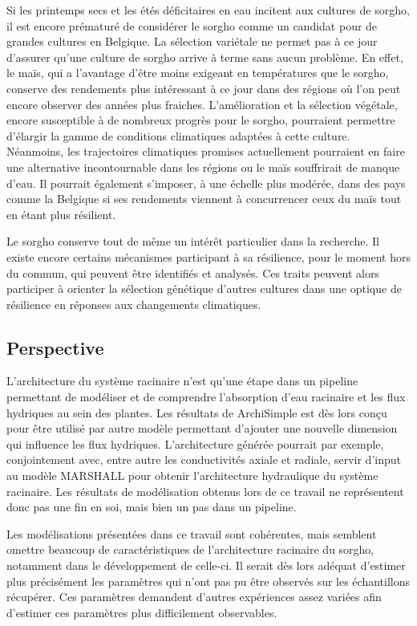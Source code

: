 Si les printemps secs et les étés déficitaires en eau incitent aux cultures de sorgho, il est encore prématuré de considérer le sorgho comme un candidat pour de grandes cultures en Belgique.
La sélection variétale ne permet pas à ce jour d'assurer qu'une culture de sorgho arrive à terme sans aucun problème.
En effet, le maïs, qui a l'avantage d'être moins exigeant en températures que le sorgho, conserve des rendements plus intéressant à ce jour dans des régions où l'on peut encore observer des années plus fraiches.
L'amélioration et la sélection végétale, encore susceptible à de nombreux progrès pour le sorgho, pourraient permettre d'élargir la gamme de conditions climatiques adaptées à cette culture.
Néanmoins, les trajectoires climatiques promises actuellement pourraient en faire une alternative incontournable dans les régions ou le maïs souffrirait de manque d'eau.
Il pourrait également s'imposer, à une échelle plus modérée, dans des pays comme la Belgique si ses rendements viennent à concurrencer ceux du maïs tout en étant plus résilient.
\newline

Le sorgho conserve tout de même un intérêt particulier dans la recherche.
Il existe encore certains mécanismes participant à sa résilience, pour le moment hors du commun, qui peuvent être identifiés et analysés.
Ces traits peuvent alors participer à orienter la sélection génétique d'autres cultures dans une optique de résilience en réponses aux changements climatiques.

\subsection{Perspective}

L'architecture du système racinaire n'est qu'une étape dans un pipeline permettant de modéliser et de comprendre l'absorption d'eau racinaire et les flux hydriques au sein des plantes.
Les résultats de ArchiSimple est dès lors conçu pour être utilisé par autre modèle permettant d'ajouter une nouvelle dimension qui influence les flux hydriques.
L'architecture générée pourrait par exemple, conjointement avec, entre autre les conductivités axiale et radiale, servir d'input au modèle MARSHALL pour obtenir l'architecture hydraulique du système racinaire.
Les résultats de modélisation obtenus lors de ce travail ne représentent donc pas une fin en soi, mais bien un pas dans un pipeline.
\newline

Les modélisations présentées dans ce travail sont cohérentes, mais semblent omettre beaucoup de caractéristiques de l'architecture racinaire du sorgho, notamment dans le développement de celle-ci.
Il serait dès lors adéquat d'estimer plus précisément les paramètres qui n'ont pas pu être observés sur les échantillons récupérer.
Ces paramètres demandent d'autres expériences assez variées afin d'estimer ces paramètres plus difficilement observables.
\newline

